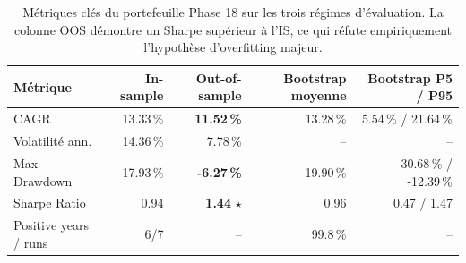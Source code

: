 \begin{table}[H]
\centering
\caption{Métriques clés du portefeuille Phase 18 sur les trois régimes d'évaluation. La colonne OOS démontre un Sharpe supérieur à l'IS, ce qui réfute empiriquement l'hypothèse d'overfitting majeur.}
\label{tab:metrics_summary}
\begin{tabular}{lrrrr}
\toprule
Métrique & In-sample & Out-of-sample & Bootstrap moyenne & Bootstrap P5 / P95 \\
\midrule
CAGR & 13.33\,\% & \textbf{11.52\,\%} & 13.28\,\% & 5.54\,\% / 21.64\,\% \\
Volatilité ann. & 14.36\,\% & 7.78\,\% & -- & -- \\
Max Drawdown & -17.93\,\% & \textbf{-6.27\,\%} & -19.90\,\% & -30.68\,\% / -12.39\,\% \\
Sharpe Ratio & 0.94 & \textbf{1.44} $\star$ & 0.96 & 0.47 / 1.47 \\
Positive years / runs & 6/7 & -- & 99.8\,\% & -- \\
\bottomrule
\end{tabular}
\end{table}
